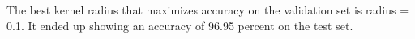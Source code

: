 \begin{answer}
The best kernel radius that maximizes accuracy on the validation set is radius = 0.1.
It ended up showing an accuracy of 96.95 percent on the test set.

\end{answer}
